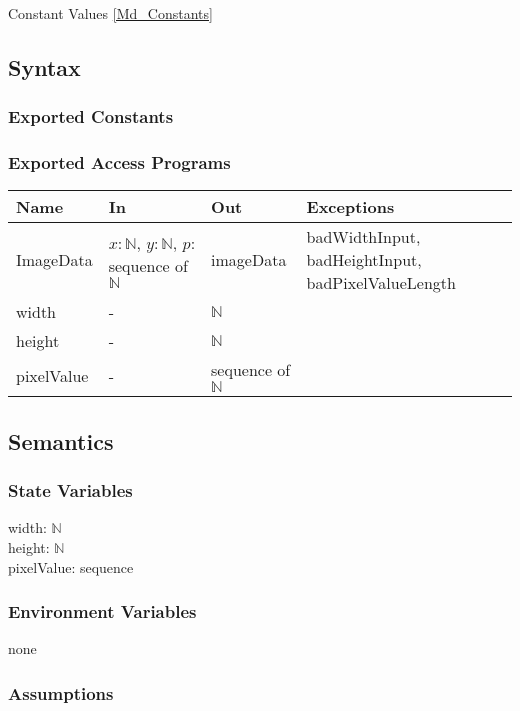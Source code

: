\documentclass[12pt, titlepage]{article}
\begin{document}
Constant Values \ref{Md_Constants}

\subsection{Syntax}

\subsubsection{Exported Constants}

\subsubsection{Exported Access Programs}

\begin{center}
\begin{tabular}{p{2cm} p{4cm} p{3cm} p{5cm}}
\hline
\textbf{Name} & \textbf{In} & \textbf{Out} & \textbf{Exceptions} \\
\hline
ImageData & $x: \mathbb{N}$, $y: \mathbb{N}$, $p$: sequence of $\mathbb{N}$ &
imageData & badWidthInput, badHeightInput, badPixelValueLength\\
width & - & $\mathbb{N}$\\
height & - & $\mathbb{N}$ & \\
pixelValue & - & sequence of $\mathbb{N}$\\
\hline
\end{tabular}
\end{center}

\subsection{Semantics}

\subsubsection{State Variables}

width: $\mathbb{N}$\\
height: $\mathbb{N}$\\
pixelValue: sequence

\subsubsection{Environment Variables}

none

\subsubsection{Assumptions}
\end{document}
